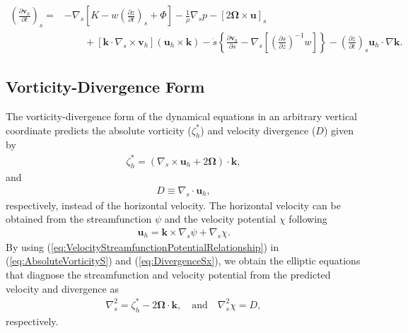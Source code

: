 \documentclass[gmd, manuscript]{copernicus}
\newcommand{\vb}{\mathbf}
\newcommand{\vg}{\boldsymbol}
\newcommand{\pdiff}[2]{\frac{\partial #1}{\partial #2}}
\providecommand{\DIFaddbegin}{} %
\providecommand{\DIFaddend}{} %
\begin{document}
\begin{align} \label{eq:CovariantUpdateEquation}
\left( \pdiff{\vb{v}_h}{t} \right)_s =& - \nabla_s \left[ K - w \left( \pdiff{z}{t} \right)_s + \Phi \right] - \frac{1}{\rho} \nabla_s p - \left[ 2 \vg{\Omega} \times \vb{u} \right]_s \nonumber \\
& \qquad + \left[ \vb{k} \cdot \nabla_s \times \vb{v}_h \right] (\vb{u}_h \times \vb{k}) - \dot{s} \left\{ \pdiff{\vb{v}_h}{s} - \nabla_s \left[ \left( \pdiff{s}{z} \right)^{-1} w \right] \right\} - \left( \pdiff{z}{t} \right)_s \vb{u}_h \cdot \nabla \vb{k}.
\end{align}

\subsection{Vorticity-Divergence Form} \DIFaddbegin \label{sec:VorticityDivergenceForm}
\DIFaddend 

The vorticity-divergence form of the dynamical equations in an arbitrary vertical coordinate predicts the absolute vorticity ($\zeta_h^\ast$) and velocity divergence ($D$) given by
\begin{align} \label{eq:AbsoluteVorticityS}
\zeta_h^\ast = (\nabla_s \times \vb{u}_h + 2 \vg{\Omega}) \cdot \vb{k},
\end{align} and
\begin{align} \label{eq:DivergenceSx}
D \equiv \nabla_s \cdot \vb{u}_h,
\end{align} respectively, instead of the horizontal velocity.  The horizontal velocity can be obtained from the streamfunction $\psi$ and the velocity potential $\chi$ following
\begin{align} \label{eq:VelocityStreamfunctionPotentialRelationship}
\vb{u}_h = \vb{k} \times \nabla_s \psi + \nabla_s \chi.
\end{align}  By using (\ref{eq:VelocityStreamfunctionPotentialRelationship}) in (\ref{eq:AbsoluteVorticityS}) and (\ref{eq:DivergenceSx}), we obtain the elliptic equations that diagnose the streamfunction and velocity potential from the predicted velocity and divergence as
\begin{align} \label{eq:LaplacianStreamfunctionPotential}
\nabla_s^2 = \zeta_h^\ast - 2 \vg{\Omega} \cdot \vb{k}, \quad \mbox{and} \quad \nabla_s^2 \chi = D,
\end{align} respectively.
\end{document}
